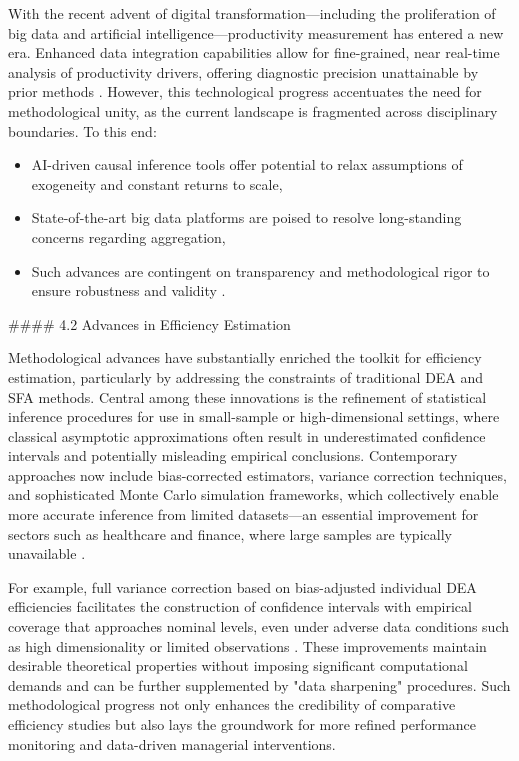 \documentclass[11pt]{article}
\begin{document}
With the recent advent of digital transformation—including the proliferation of big data and artificial intelligence—productivity measurement has entered a new era. Enhanced data integration capabilities allow for fine-grained, near real-time analysis of productivity drivers, offering diagnostic precision unattainable by prior methods \cite{ref86}. However, this technological progress accentuates the need for methodological unity, as the current landscape is fragmented across disciplinary boundaries. To this end:

\begin{itemize}
    \item AI-driven causal inference tools offer potential to relax assumptions of exogeneity and constant returns to scale,
    \item State-of-the-art big data platforms are poised to resolve long-standing concerns regarding aggregation,
    \item Such advances are contingent on transparency and methodological rigor to ensure robustness and validity \cite{ref86}.
\end{itemize}

#### 4.2 Advances in Efficiency Estimation

Methodological advances have substantially enriched the toolkit for efficiency estimation, particularly by addressing the constraints of traditional DEA and SFA methods. Central among these innovations is the refinement of statistical inference procedures for use in small-sample or high-dimensional settings, where classical asymptotic approximations often result in underestimated confidence intervals and potentially misleading empirical conclusions. Contemporary approaches now include bias-corrected estimators, variance correction techniques, and sophisticated Monte Carlo simulation frameworks, which collectively enable more accurate inference from limited datasets—an essential improvement for sectors such as healthcare and finance, where large samples are typically unavailable \cite{ref87}.

For example, full variance correction based on bias-adjusted individual DEA efficiencies facilitates the construction of confidence intervals with empirical coverage that approaches nominal levels, even under adverse data conditions such as high dimensionality or limited observations \cite{ref87}. These improvements maintain desirable theoretical properties without imposing significant computational demands and can be further supplemented by "data sharpening" procedures. Such methodological progress not only enhances the credibility of comparative efficiency studies but also lays the groundwork for more refined performance monitoring and data-driven managerial interventions.
\end{document}
